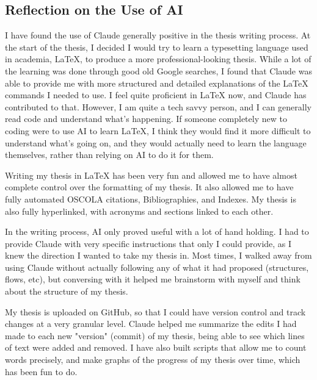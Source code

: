 \begin{appendices}
\newpage

\subsection{Reflection on the Use of AI}

I have found the use of Claude generally positive in the thesis writing process.
At the start of the thesis, I decided I would try to learn a typesetting language used in academia, LaTeX, to produce a more professional-looking thesis.
While a lot of the learning was done through good old Google searches, I found that Claude was able to provide me with more structured and detailed explanations of the LaTeX commands I needed to use.
I feel quite proficient in LaTeX now, and Claude has contributed to that. 
However, I am quite a tech savvy person, and I can generally read code and understand what's happening.
If someone completely new to coding were to use AI to learn LaTeX, I think they would find it more difficult to understand what's going on, and they would actually need to learn the language themselves, rather than relying on AI to do it for them.

Writing my thesis in LaTeX has been very fun and allowed me to have almost complete control over the formatting of my thesis.
It also allowed me to have fully automated OSCOLA citations, Bibliographies, and Indexes. 
My thesis is also fully hyperlinked, with acronyms and sections linked to each other.

In the writing process, AI only proved useful with a lot of hand holding.
I had to provide Claude with very specific instructions that only I could provide, as I knew the direction I wanted to take my thesis in. 
Most times, I walked away from using Claude without actually following any of what it had proposed (structures, flows, etc), but conversing with it helped me brainstorm with myself and think about the structure of my thesis.

My thesis is uploaded on GitHub, so that I could have version control and track changes at a very granular level. 
Claude helped me summarize the edits I had made to each new "version" (commit) of my thesis, being able to see which lines of text were added and removed. 
I have also built scripts that allow me to count words precisely, and make graphs of the progress of my thesis over time, which has been fun to do.


\end{appendices}